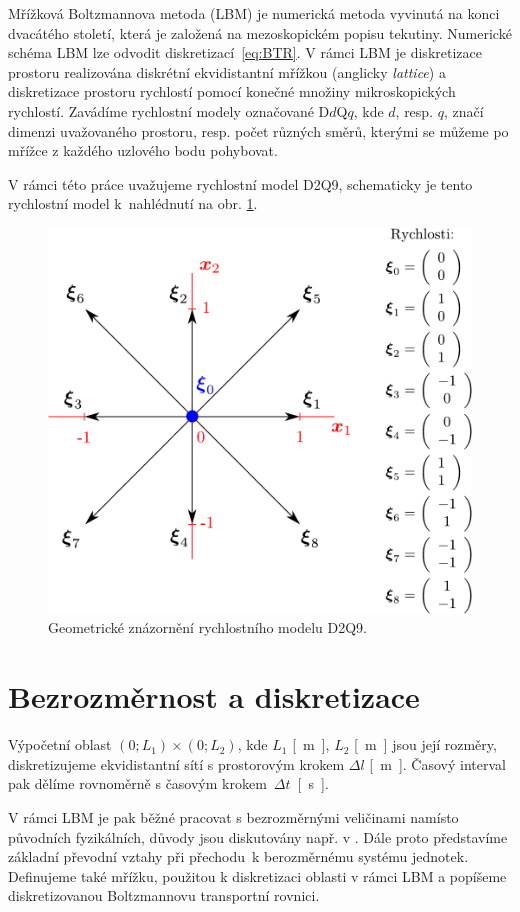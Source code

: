 Mřížková Boltzmannova metoda (LBM) je numerická metoda vyvinutá na konci dvacátého století, která je založená na mezoskopickém popisu tekutiny. Numerické schéma LBM lze odvodit diskretizací~\eqref{eq:BTR}. V rámci LBM je diskretizace prostoru realizována diskrétní ekvidistantní mřížkou (anglicky \textit{lattice}) a diskretizace prostoru rychlostí pomocí konečné množiny mikroskopických rychlostí. Zavádíme rychlostní modely označované D$d$Q$q$, kde $ d$, resp. $q $, značí dimenzi uvažovaného prostoru, resp. počet různých směrů, kterými se můžeme po mřížce z každého uzlového bodu pohybovat.

V rámci této práce uvažujeme rychlostní model D2Q9, schematicky je tento rychlostní model k~nahlédnutí na obr. \ref{fig:d2q9}.

\begin{figure}[h]
	\centering
	\vspace{4mm}
	\includegraphics[width=.71\textwidth]{Images/d2q9.pdf}
	\caption{Geometrické znázornění rychlostního modelu D2Q9.}
	\label{fig:d2q9}
\end{figure}

\section{Bezrozměrnost a diskretizace}
Výpočetní oblast $ (0 ; L_1) \times(0 ; L_2)$, kde $ L_1 $ \si{[m]}, $ L_2 $ \si{[m]} jsou její rozměry, diskretizujeme ekvidistantní sítí s prostorovým krokem $ \Delta l $ \si{[m]}. Časový interval pak dělíme rovnoměrně s časovým krokem~$ \Delta t $~\si{[s]}.

V rámci LBM je pak běžné pracovat s bezrozměrnými veličinami namísto původních fyzikálních, důvody jsou diskutovány např. v \cite{Kruger}. Dále proto představíme základní převodní vztahy při přechodu~k berozměrnému systému jednotek. Definujeme také mřížku, použitou k diskretizaci oblasti v rámci LBM a popíšeme diskretizovanou Boltzmannovu transportní rovnici.

